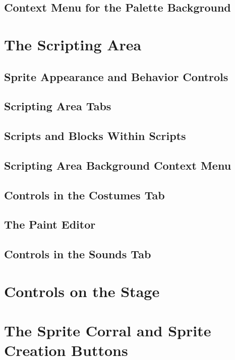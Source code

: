 \documentclass[a4paper]{report}
\begin{document}
\subsection{Context Menu for the Palette Background}
\section{The Scripting Area}
\subsection{Sprite Appearance and Behavior Controls}
\subsection{Scripting Area Tabs}
\subsection{Scripts and Blocks Within Scripts}
\subsection{Scripting Area Background Context Menu}
\subsection{Controls in the Costumes Tab}
\subsection{The Paint Editor}
\subsection{Controls in the Sounds Tab}
\section{Controls on the Stage}
\section{The Sprite Corral and Sprite Creation Buttons}
\end{document}
